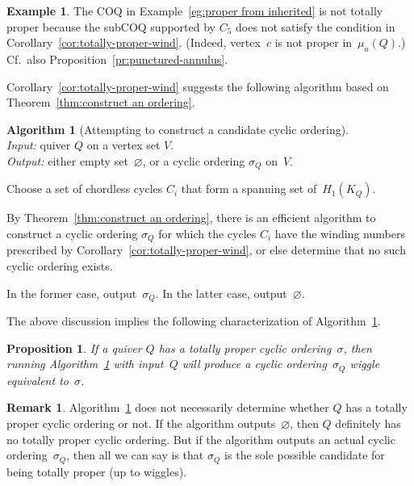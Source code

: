 \documentclass[11pt, letterpaper]{amsart}
\newtheorem{proposition}[theorem]{Proposition}
\theoremstyle{definition}
\newtheorem{remark}[theorem]{Remark}
\newtheorem{example}[theorem]{Example}
\newtheorem{algorithm}[theorem]{Algorithm}
\numberwithin{equation}{section}
\newcommand\GQ{K_Q}
\begin{document}
\begin{example}
The COQ in Example~\ref{eg:proper from inherited} is not totally proper because 
the subCOQ supported by $C_5$ does not satisfy the condition in Corollary~\ref{cor:totally-proper-wind}.
(Indeed, vertex~$c$ is not proper in~$\mu_a(Q)$.) 
Cf.\ also Proposition~\ref{pr:punctured-annulus}.
\end{example}

Corollary~\ref{cor:totally-proper-wind} suggests the following algorithm based on Theorem~\ref{thm:construct an ordering}. 



\begin{algorithm}[Attempting to construct a candidate cyclic ordering]
\label{alg:sigma-Q}
\ \\
\emph{Input:} quiver $Q$ on a vertex set $V$. \\
\emph{Output:} either empty set~$\varnothing$, or a cyclic ordering $\sigma_Q$ on~$V$.

Choose a set of chordless cycles $C_i$ that form a spanning set of~$H_1(\GQ)$.

By Theorem~\ref{thm:construct an ordering}, 
there is an efficient algorithm to construct a cyclic ordering $\sigma_Q$ 
for which the cycles $C_i$ have the winding numbers prescribed by Corollary~\ref{cor:totally-proper-wind}, 
or else determine that no such cyclic ordering exists.

In the former case, output~$\sigma_Q$. 
%
In the latter case, output~$\varnothing$. %
\end{algorithm}

The above discussion implies the following characterization of Algorithm~\ref{alg:sigma-Q}. 

\begin{proposition}
\label{pr:sigma-Q}
If a quiver $Q$ has a totally proper cyclic ordering~$\sigma$, 
then running  Algorithm~\ref{alg:sigma-Q} with input~$Q$
will produce a cyclic ordering~$\sigma_Q$ wiggle equivalent to~$\sigma$. 
\end{proposition}

\begin{remark}
Algorithm~\ref{alg:sigma-Q} does not necessarily determine whether
$Q$ has a totally proper cyclic ordering or not.
If the algorithm outputs~$\varnothing$, then $Q$ definitely has no totally proper cyclic ordering.
But if the algorithm outputs an actual cyclic ordering~$\sigma_Q$, 
then all we can say is that $\sigma_Q$ is the sole possible candidate for being totally proper (up to wiggles). 
\end{remark}
\end{document}
